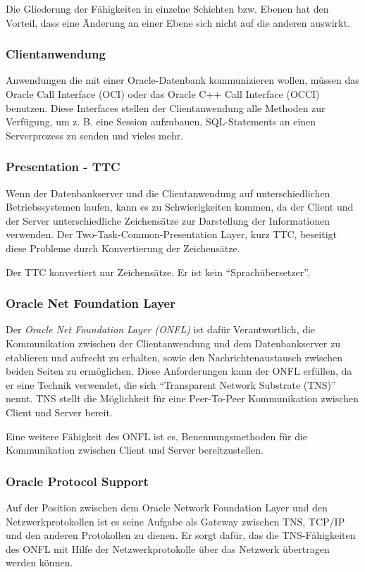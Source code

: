         Die Gliederung der F\"ahigkeiten in einzelne Schichten bzw. Ebenen hat den Vorteil, dass eine \"Anderung an einer Ebene sich nicht auf die anderen auswirkt.
        \subsubsection{Clientanwendung}
          Anwendungen die mit einer Oracle-Datenbank kommunizieren wollen, m\"ussen das Oracle Call Interface (OCI) oder das Oracle C++ Call Interface (OCCI) benutzen. Diese Interfaces stellen der Clientanwendung alle Methoden zur Verf\"ugung, um z. B. eine Session aufzubauen, SQL-Statements an einen Serverprozess zu senden und vieles mehr.
        \subsubsection{Presentation - TTC}
          Wenn der Datenbankserver und die Clientanwendung auf unterschiedlichen Betriebssystemen laufen, kann es zu Schwierigkeiten kommen, da der Client und der Server unterschiedliche Zeichens\"atze zur Darstellung der Informationen verwenden. Der Two-Task-Common-Presentation Layer, kurz TTC, beseitigt diese Probleme durch Konvertierung der Zeichens\"atze.
          \begin{merke}
            Der TTC konvertiert nur Zeichens\"atze. Er ist kein \enquote{Sprach\"ubersetzer}.
          \end{merke}


        \subsubsection{Oracle Net Foundation Layer}
          Der \textit{Oracle Net Foundation Layer (ONFL)} ist daf\"ur Verantwortlich, die Kommunikation zwischen der Clientanwendung und dem Datenbankserver zu etablieren und aufrecht zu erhalten, sowie den Nachrichtenaustausch zwischen beiden Seiten zu erm\"oglichen. Diese Anforderungen kann der ONFL erf\"ullen, da er eine Technik verwendet, die sich \enquote{Transparent Network Substrate (TNS)} nennt. TNS stellt die M\"oglichkeit f\"ur eine Peer-To-Peer Kommunikation zwischen Client und Server bereit.

          Eine weitere F\"ahigkeit des ONFL ist es, Benennungsmethoden f\"ur die Kommunikation zwischen Client und Server bereitzustellen.
        \subsubsection{Oracle Protocol Support}
          Auf der Position zwischen dem Oracle Network Foundation Layer und den Netzwerkprotokollen ist es seine Aufgabe als Gateway zwischen TNS, TCP/IP und den anderen Protokollen zu dienen. Er sorgt daf\"ur, das die TNS-F\"ahigkeiten des ONFL mit Hilfe der Netzwerkprotokolle \"uber das Netzwerk \"ubertragen werden k\"onnen.
